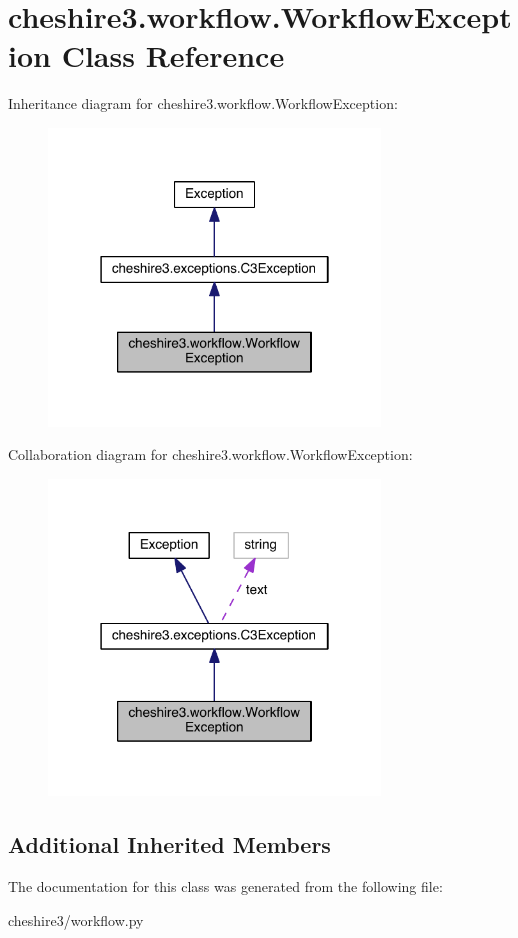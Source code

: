 \hypertarget{classcheshire3_1_1workflow_1_1_workflow_exception}{\section{cheshire3.\-workflow.\-Workflow\-Exception Class Reference}
\label{classcheshire3_1_1workflow_1_1_workflow_exception}
}


Inheritance diagram for cheshire3.\-workflow.\-Workflow\-Exception\-:
\nopagebreak
\begin{figure}[H]
\begin{center}
\leavevmode
\includegraphics[width=250pt]{classcheshire3_1_1workflow_1_1_workflow_exception__inherit__graph}
\end{center}
\end{figure}


Collaboration diagram for cheshire3.\-workflow.\-Workflow\-Exception\-:
\nopagebreak
\begin{figure}[H]
\begin{center}
\leavevmode
\includegraphics[width=250pt]{classcheshire3_1_1workflow_1_1_workflow_exception__coll__graph}
\end{center}
\end{figure}
\subsection*{Additional Inherited Members}


The documentation for this class was generated from the following file\-:\begin{DoxyCompactItemize}
\item 
cheshire3/workflow.\-py\end{DoxyCompactItemize}
